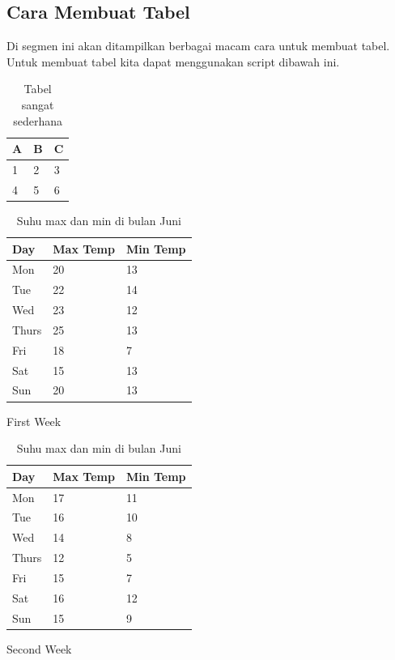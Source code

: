 \subsection{Cara Membuat Tabel}{
    Di segmen ini akan ditampilkan berbagai macam cara untuk membuat tabel. Untuk membuat tabel kita dapat menggunakan script dibawah ini. 
    \begin{table}[h]
        \centering
        \begin{tabular}{| l | l | l |}
            \hline
            A & B & C \\
            \hline
            1 & 2 & 3 \\
            4 & 5 & 6 \\
            \hline
        \end{tabular}
        \caption{Tabel sangat sederhana}
        \label{tab:abc}
    \end{table}

    \begin{table}[h]
        \begin{subtable}[h]{0.45\textwidth}
            \centering
            \begin{tabular}{l | l | l}
            Day & Max Temp & Min Temp \\
            \hline \hline
            Mon & 20 & 13\\
            Tue & 22 & 14\\
            Wed & 23 & 12\\
            Thurs & 25 & 13\\
            Fri & 18 & 7\\
            Sat & 15 & 13\\
            Sun & 20 & 13
           \end{tabular}
           \caption{First Week}
           \label{tab:week1}
        \end{subtable}
        \hfill
        \begin{subtable}[h]{0.45\textwidth}
            \centering
            \begin{tabular}{l | l | l}
            Day & Max Temp & Min Temp \\
            \hline \hline
            Mon & 17 & 11\\
            Tue & 16 & 10\\
            Wed & 14 & 8\\
            Thurs & 12 & 5\\
            Fri & 15 & 7\\
            Sat & 16 & 12\\
            Sun & 15 & 9
            \end{tabular}
            \caption{Second Week}
            \label{tab:week2}
         \end{subtable}
         \caption{Suhu max dan min di bulan Juni}
         \label{tab:temps}
    \end{table}
}

